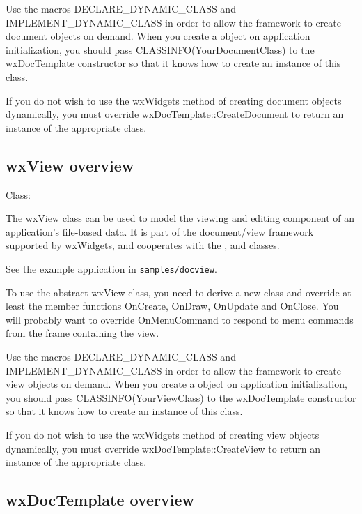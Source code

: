 Use the macros DECLARE\_DYNAMIC\_CLASS and IMPLEMENT\_DYNAMIC\_CLASS in order
to allow the framework to create document objects on demand. When you create
a  object on application initialization, you
should pass CLASSINFO(YourDocumentClass) to the wxDocTemplate constructor
so that it knows how to create an instance of this class.

If you do not wish to use the wxWidgets method of creating document
objects dynamically, you must override wxDocTemplate::CreateDocument
to return an instance of the appropriate class.

\subsection{wxView overview}\label{wxviewoverview}


Class: 

The wxView class can be used to model the viewing and editing component of
an application's file-based data. It is part of the document/view framework supported by wxWidgets,
and cooperates with the , 
and  classes.

See the example application in {\tt samples/docview}.

To use the abstract wxView class, you need to derive a new class and override
at least the member functions OnCreate, OnDraw, OnUpdate and OnClose. You will probably
want to override OnMenuCommand to respond to menu commands from the frame containing the
view.

Use the macros DECLARE\_DYNAMIC\_CLASS and IMPLEMENT\_DYNAMIC\_CLASS in order
to allow the framework to create view objects on demand. When you create
a  object on application initialization, you
should pass CLASSINFO(YourViewClass) to the wxDocTemplate constructor
so that it knows how to create an instance of this class.

If you do not wish to use the wxWidgets method of creating view
objects dynamically, you must override wxDocTemplate::CreateView
to return an instance of the appropriate class.

\subsection{wxDocTemplate overview}\label{wxdoctemplateoverview}

